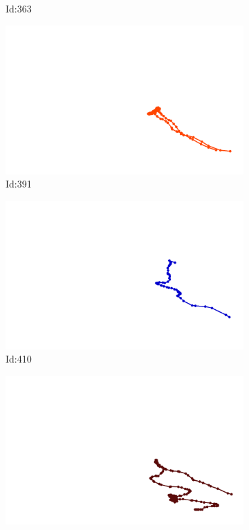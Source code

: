 \documentclass[12pt,twoside]{report}
\begin{document}
\begin{figure}
\begin{subfigure}[b]{0.20\textwidth}
\caption{Id:363}
\end{subfigure}
\begin{subfigure}[b]{0.20\textwidth}
\centering
\includegraphics[width=\textwidth]{../trajectories/391.png}
\caption{Id:391}
\end{subfigure}
\begin{subfigure}[b]{0.20\textwidth}
\centering
\includegraphics[width=\textwidth]{../trajectories/410.png}
\caption{Id:410}
\end{subfigure}
\begin{subfigure}[b]{0.20\textwidth}
\centering
\includegraphics[width=\textwidth]{../trajectories/439.png}

\end{subfigure}
\end{figure}
\end{document}
